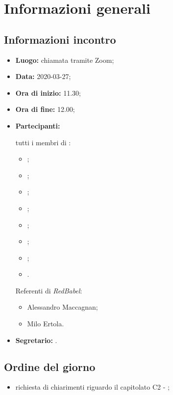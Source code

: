 \section{Informazioni generali}
\subsection{Informazioni incontro}
\begin{itemize}
	\item \textbf{Luogo:} chiamata tramite Zoom;
	\item \textbf{Data:} 2020-03-27;
	\item \textbf{Ora di inizio:} 11.30;
	\item \textbf{Ora di fine:} 12.00;
	\item \textbf{Partecipanti:}
		
		tutti i membri di \Gruppo:
		\begin{itemize}
			\item \VB;
			\item \LB;
			\item \NF;
			\item \EG;
			\item \FJ;
			\item \MP;
			\item \AS;
			\item \AZ.
		\end{itemize}
		
		Referenti di \textit{RedBabel}:
		\begin{itemize}
			\item Alessandro Maccagnan;
			\item Milo Ertola.
		\end{itemize}
	\item \textbf{Segretario:} \FJ.
\end{itemize}

\subsection{Ordine del giorno}
\begin{itemize}
	\item richiesta di chiarimenti riguardo il capitolato C2 - \NomeProgetto;
\end{itemize}
